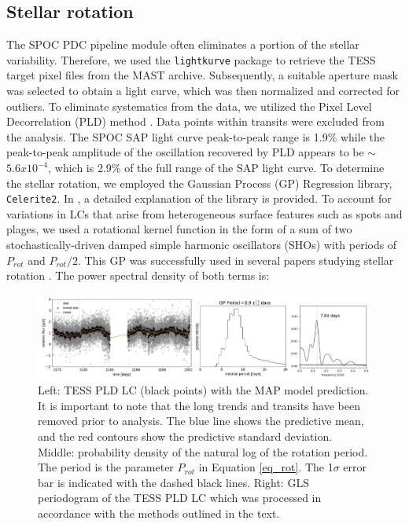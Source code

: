 \documentclass[traditabstract,longauth]{aa}
\begin{document}
\subsection{Stellar rotation} \label{rotation}

The SPOC PDC pipeline module often eliminates a portion of the stellar variability. Therefore, we used the {\tt lightkurve} package to retrieve the TESS target pixel files from the MAST archive. Subsequently, a suitable aperture mask was selected to obtain a light curve, which was then normalized and corrected for outliers. To eliminate systematics from the data, we utilized the Pixel Level Decorrelation (PLD) method \citep{Deming15}. Data points within transits were excluded from the analysis. The SPOC SAP light curve peak-to-peak range is 1.9\% while the peak-to-peak amplitude of the oscillation recovered by PLD appears to be $\sim$$5.6x10^{-4}$, which is 2.9\% of the full range of the SAP light curve. To determine the stellar rotation, we employed the Gaussian Process (GP) Regression library, {\tt Celerite2}. In \citet{Foreman17,celerite2}, a detailed explanation of the library is provided. To account for variations in LCs that arise from heterogeneous surface features such as spots and plages, we used a rotational kernel function in the form of a sum of two stochastically-driven damped simple harmonic oscillators (SHOs) with periods of $P_{rot}$ and $P_{rot}/2$. This GP was successfully used in several papers studying stellar rotation \citep[e.g.,][]{David2019,Gillen20}. The power spectral density of both terms is:

\begin{figure}
\centering
\includegraphics[width=1.0\textwidth]{figures/rotation_analysis_v2.pdf}
\caption{Left: TESS PLD LC (black points) with the MAP model prediction. It is important to note that the long trends and transits have been removed prior to analysis. The blue line shows the predictive mean, and the red contours show the predictive standard deviation. Middle: probability density of the natural log of the rotation period. The period is the parameter $P_{rot}$ in Equation \ref{eq_rot}. The 1$\sigma$ error bar is indicated with the dashed black lines. Right: GLS periodogram of the TESS PLD LC which was processed in accordance with the methods outlined in the text.} \label{fig:gp_plots}
\end{figure}
\end{document}
